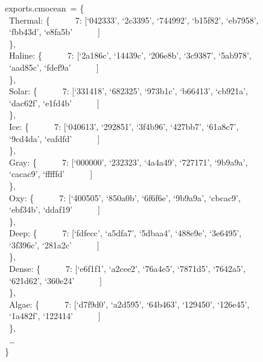 \documentclass[
  letterpaper,
  DIV=11,
  numbers=noendperiod]{scrreprt}
\begin{document}
exports.cmocean~= \{\\
\hspace*{0.333em} ~Thermal: \{~ ~ ~ ~7: {[}`042333', `2c3395', `744992',
`b15f82', `eb7958',~ ~ ~ ~ ~ ~`fbb43d', `e8fa5b'~ ~ ~ ~{]}\\
\hspace*{0.333em} ~\},\\
\hspace*{0.333em} ~Haline: \{~ ~ ~ ~7: {[}`2a186c', `14439c', `206e8b',
`3c9387', `5ab978',~ ~ ~ ~ ~ ~`aad85c', `fdef9a'~ ~ ~ ~{]}\\
\hspace*{0.333em} ~\},\\
\hspace*{0.333em} ~Solar: \{~ ~ ~ ~7: {[}`331418', `682325', `973b1c',
`b66413', `cb921a',~ ~ ~ ~ ~ ~`dac62f', `e1fd4b'~ ~ ~ ~{]}\\
\hspace*{0.333em} ~\},\\
\hspace*{0.333em} ~Ice: \{~ ~ ~ ~7: {[}`040613', `292851', `3f4b96',
`427bb7', `61a8c7',~ ~ ~ ~ ~ ~`9cd4da', `eafdfd'~ ~ ~ ~{]}\\
\hspace*{0.333em} ~\},\\
\hspace*{0.333em} ~Gray: \{~ ~ ~ ~7: {[}`000000', `232323', `4a4a49',
`727171', `9b9a9a',~ ~ ~ ~ ~ ~`cacac9', `fffffd'~ ~ ~ ~{]}\\
\hspace*{0.333em} ~\},\\
\hspace*{0.333em} ~Oxy: \{~ ~ ~ ~7: {[}`400505', `850a0b', `6f6f6e',
`9b9a9a', `cbcac9',~ ~ ~ ~ ~ ~`ebf34b', `ddaf19'~ ~ ~ ~{]}\\
\hspace*{0.333em} ~\},\\
\hspace*{0.333em} ~Deep: \{~ ~ ~ ~7: {[}`fdfecc', `a5dfa7', `5dbaa4',
`488e9e', `3e6495',~ ~ ~ ~ ~ ~`3f396c', `281a2c'~ ~ ~ ~{]}\\
\hspace*{0.333em} ~\},\\
\hspace*{0.333em} ~Dense: \{~ ~ ~ ~7: {[}`e6f1f1', `a2cee2', `76a4e5',
`7871d5', `7642a5',~ ~ ~ ~ ~ ~`621d62', `360e24'~ ~ ~ ~{]}\\
\hspace*{0.333em} ~\},\\
\hspace*{0.333em} ~Algae: \{~ ~ ~ ~7: {[}`d7f9d0', `a2d595', `64b463',
`129450', `126e45',~ ~ ~ ~ ~ ~`1a482f', `122414'~ ~ ~ ~{]}\\
\hspace*{0.333em} ~\},\\
\hspace*{0.333em} ~\ldots{}\\
\}
\end{document}
